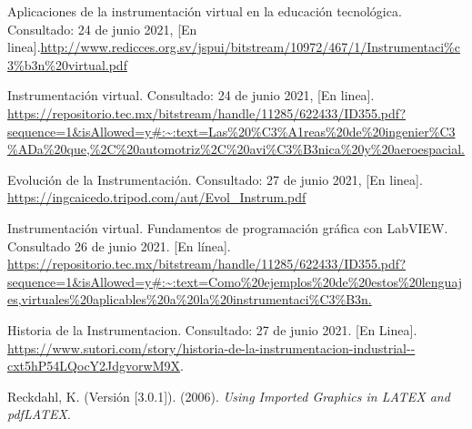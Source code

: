 \documentclass[12pt,letterpaper, onecolumn, titlepage, oneside]{book}
\begin{document}
\begin{thebibliography}{99}



\bibitem{} Aplicaciones de la instrumentación virtual en la educación tecnológica. Consultado: 24 de junio 2021, [En linea].\url{http://www.redicces.org.sv/jspui/bitstream/10972/467/1/Instrumentaci%c3%b3n%20virtual.pdf}

\bibitem{} Instrumentación virtual. Consultado: 24 de junio 2021, [En linea]. \url{https://repositorio.tec.mx/bitstream/handle/11285/622433/ID355.pdf?sequence=1&isAllowed=y#:~:text=Las\%20\%C3\%A1reas\%20de\%20ingenier\%C3\%ADa\%20que,\%2C\%20automotriz\%2C\%20avi\%C3\%B3nica\%20y\%20aeroespacial.}

\bibitem{} Evolución de la Instrumentación. Consultado: 27 de junio 2021, [En linea]. \url{https://ingcaicedo.tripod.com/aut/Evol_Instrum.pdf}

\bibitem{} Instrumentación virtual. Fundamentos de programación gráfica con LabVIEW. Consultado 26 de junio 2021. [En línea]. \url{https://repositorio.tec.mx/bitstream/handle/11285/622433/ID355.pdf?sequence=1&isAllowed=y#:~:text=Como\%20ejemplos\%20de\%20estos\%20lenguajes,virtuales\%20aplicables\%20a\%20la\%20instrumentaci\%C3\%B3n.}

\bibitem{} Historia de la Instrumentacion. Consultado: 27 de junio 2021. [En Linea]. \url{https://www.sutori.com/story/historia-de-la-instrumentacion-industrial--cxt5hP54LQocY2JdgvorwM9X}.

\bibitem{} Reckdahl, K. (Versión [3.0.1]). (2006).\textit{ Using Imported Graphics in LATEX and pdfLATEX}.

\end{thebibliography}
\end{document}
